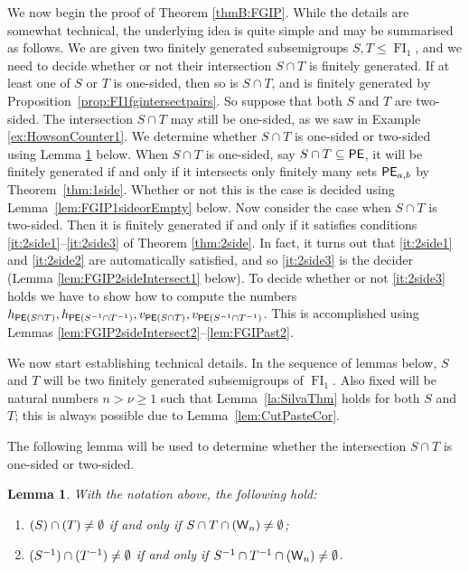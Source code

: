 \documentclass[reqno]{amsart}
\theoremstyle{plain}
\newtheorem{lem}{Lemma}[section]
\theoremstyle{definition}
\DeclareMathOperator{\FI}{FI}
\let\P\relax
\DeclareMathOperator{\P}{\textup{\textsf{P}}}
\DeclareMathOperator{\PE}{\textup{\textsf{PE}}}
\DeclareMathOperator{\W}{\textup{\textsf{W}}}
\newenvironment{thmenumerate}{\begin{enumerate}[topsep=0mm, leftmargin=14mm,itemsep=1mm,label=\textup{(\roman*)}]
}{\end{enumerate}}
\numberwithin{equation}{section}
\begin{document}
We now begin the proof of Theorem \ref{thmB:FGIP}.
While the details are somewhat technical, the underlying idea is quite simple and may be summarised as follows.
We are given two finitely generated subsemigroups $S,T\leq \FI_1$, and we need to decide whether or not their intersection $S\cap T$ is finitely generated.
If at least one of $S$ or $T$ is one-sided, then so is $S\cap T$, and is finitely generated by 
Proposition~\ref{prop:FI1fgintersectpairs}.
So suppose that both $S$ and $T$ are two-sided.
The intersection $S\cap T$ may still be one-sided, as we saw in 
Example \ref{ex:HowsonCounter1}.
We determine whether $S\cap T$ is one-sided or two-sided using
Lemma \ref{lem:FGIPDet2side} below.
When $S\cap T$ is one-sided, say $S\cap T\subseteq \PE$, it will be finitely generated if and only if it intersects only finitely many sets $\PE_{a,b}$ by 
Theorem~\ref{thm:1side}. Whether or not this is the case is decided using Lemma~\ref{lem:FGIP1sideorEmpty} below.
Now consider the case when $S\cap T$ is two-sided.
Then it is finitely generated if and only if it satisfies conditions 
\ref{it:2side1}--\ref{it:2side3} of Theorem \ref{thm:2side}.
In fact, it turns out that \ref{it:2side1} and \ref{it:2side2} are automatically satisfied, and so \ref{it:2side3} is the decider (Lemma \ref{lem:FGIP2sideIntersect1} below).
To decide whether or not \ref{it:2side3} holds we have to 
show how to compute the numbers
$h_{\PE(S\cap T)}, h_{\PE(S^{-1}\cap T^{-1})}, v_{\PE(S\cap T)}, v_{\PE(S^{-1}\cap T^{-1})}$.
This is accomplished using Lemmas \ref{lem:FGIP2sideIntersect2}--\ref{lem:FGIPast2}. 



We now start establishing technical details. In the sequence of lemmas below, $S$ and $T$ will be two finitely generated subsemigroups of $\FI_1$.
Also fixed will be natural numbers $n>\nu\geq 1$ such that Lemma~\ref{la:SilvaThm} holds for both $S$ and $T$; this is always possible due to Lemma~\ref{lem:CutPasteCor}.

The following lemma will be used to determine whether the intersection $S\cap T$ is one-sided or two-sided.


\begin{lem}
\label{lem:FGIPDet2side}
With the notation above, the following hold:
\begin{thmenumerate}
    \item \label{it:FGIPDet2side-1} $\P(S)\cap \P(T)\neq \emptyset$ if and only if $S\cap T\cap \P(\W_{n})\neq\emptyset$;
    \item \label{it:FGIPDet2side-2} $\P(S^{-1})\cap \P(T^{-1}) \neq \emptyset$ if and only if $S^{-1}\cap T^{-1}\cap \P(\W_{n})\neq \emptyset$.
\end{thmenumerate}
\end{lem}
\end{document}

